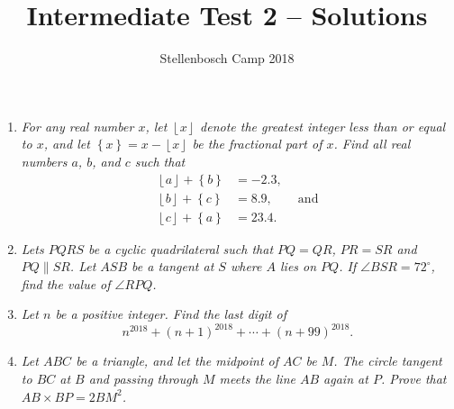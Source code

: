 \documentclass{article}
\title{Intermediate Test 2 -- Solutions}
\author{Stellenbosch Camp 2018}
\date{\vspace{-12pt}}
\newcommand{\floor}[1]{\ensuremath{\left\lfloor#1\right\rfloor}}
\newcommand{\fracpart}[1]{\ensuremath{\left\{#1\right\}}}
\begin{document}
\maketitle

\begin{enumerate}

\item %
\textit{For any real number $x$, let $\floor{x}$ denote the greatest integer less than or equal to $x$, and let $\fracpart{x} = x -\floor{x}$ be the fractional part of $x$. Find all real numbers $a$, $b$, and $c$ such that
\begin{align*}
  \floor{a} +\fracpart{b} &= -2.3, \\
  \floor{b} +\fracpart{c} &= 8.9, \qquad \mathrm{and}\\
  \floor{c} +\fracpart{a} &= 23.4.
\end{align*}}


\vspace{12pt}
\item %
\textit{Lets $PQRS$ be a cyclic quadrilateral such that $PQ = QR$, $PR = SR$ and $PQ \parallel SR$. Let $ASB$ be a tangent at $S$ where $A$ lies on $PQ$. If $\angle BSR = 72^{\circ}$, find the value of $\angle RPQ$.}


\vspace{12pt}
\item %
\textit{Let $n$ be a positive integer. Find the last digit of \[ n^{2018} +(n+1)^{2018} +\dotsb +(n+99)^{2018}. \]}


\vspace{12pt}
\item %
\textit{Let $ABC$ be a triangle, and let the midpoint of $AC$ be $M$. The circle tangent to $BC$ at $B$ and passing through $M$ meets the line $AB$ again at $P$. Prove that $AB \times BP = 2 BM^2$.}

\begin{figure}[H]
\begin{center}
\end{center}		
\end{figure}


\end{enumerate}
\end{document}
